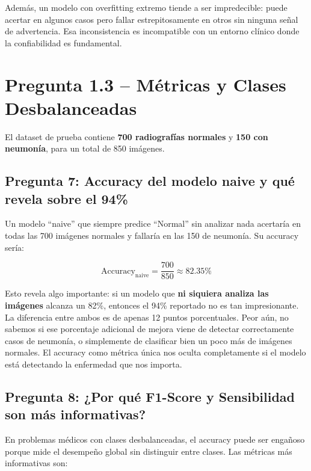 \documentclass[12pt, letterpaper]{article}
\begin{document}
Además, un modelo con overfitting extremo tiende a ser impredecible: puede acertar en algunos
casos pero fallar estrepitosamente en otros sin ninguna señal de advertencia. Esa inconsistencia
es incompatible con un entorno clínico donde la confiabilidad es fundamental.

\section{Pregunta 1.3 -- Métricas y Clases Desbalanceadas}

El dataset de prueba contiene \textbf{700 radiografías normales} y \textbf{150 con neumonía},
para un total de 850 imágenes.

\subsection{Pregunta 7: Accuracy del modelo naive y qué revela sobre el 94\%}

Un modelo ``naive'' que siempre predice ``Normal'' sin analizar nada acertaría en todas las 700
imágenes normales y fallaría en las 150 de neumonía. Su accuracy sería:

\[
\text{Accuracy}_{\text{naive}} = \frac{700}{850} \approx \mathbf{82.35\%}
\]

Esto revela algo importante: si un modelo que \textbf{ni siquiera analiza las imágenes} alcanza
un 82\%, entonces el 94\% reportado no es tan impresionante. La diferencia entre ambos es de apenas
12 puntos porcentuales. Peor aún, no sabemos si ese porcentaje adicional de mejora viene de detectar
correctamente casos de neumonía, o simplemente de clasificar bien un poco más de imágenes normales.
El accuracy como métrica única nos oculta completamente si el modelo está detectando la enfermedad
que nos importa.

\subsection{Pregunta 8: ¿Por qué F1-Score y Sensibilidad son más informativas?}

En problemas médicos con clases desbalanceadas, el accuracy puede ser engañoso porque mide
el desempeño global sin distinguir entre clases. Las métricas más informativas son:
\end{document}
